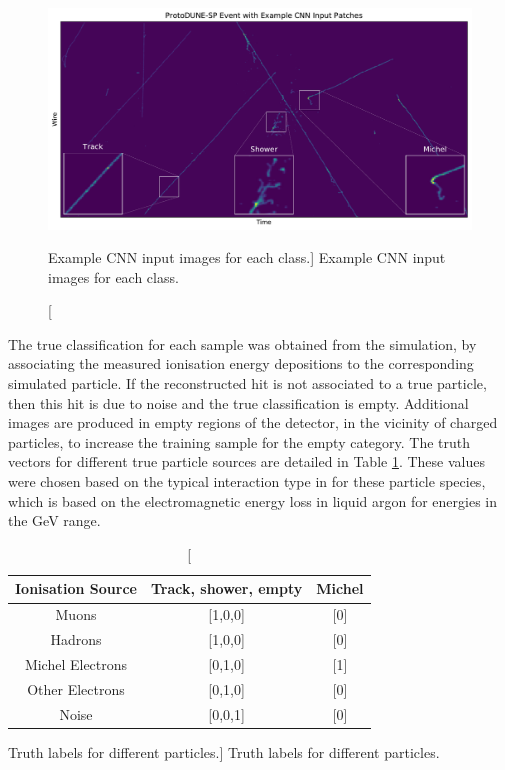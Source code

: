 \begin{figure}
	\centering
	\includegraphics[width=\textwidth]{figures/patch_zoom.pdf}  
	\caption
	[Example CNN input images for each class.]
	{Example CNN input images for each class.}
	\label{fig:patches}
\end{figure}

The true classification for each sample was obtained from the simulation, by 
associating the measured ionisation energy depositions to the corresponding
simulated particle. If the reconstructed hit is not associated to a true
particle, then this hit is due to noise and the true classification is empty.
Additional images are produced in empty regions of the detector, in the 
vicinity of charged particles, to increase the training sample for the empty 
category. The truth vectors for different true particle sources are detailed 
in Table \ref{tab:ground_truth}. These values were chosen based on the typical 
interaction type in \protodune{} for these particle species, which is based on 
the electromagnetic energy loss in liquid argon for energies in the GeV range.
\begin{table}
	\centering
	\bgroup
	\def\arraystretch{1.5}
	\begin{tabular}{c|c|c}
		Ionisation Source & Track, shower, empty & Michel \\ \hline
		Muons             & [1,0,0]              & [0]    \\
		Hadrons           & [1,0,0]              & [0]    \\
		Michel Electrons  & [0,1,0]              & [1]    \\
		Other Electrons   & [0,1,0]              & [0]    \\
		Noise             & [0,0,1]              & [0]    \\
	\end{tabular}
	\egroup
	\caption
	[Truth labels for different particles.]
	{Truth labels for different particles.}
	\label{tab:ground_truth}
\end{table}

